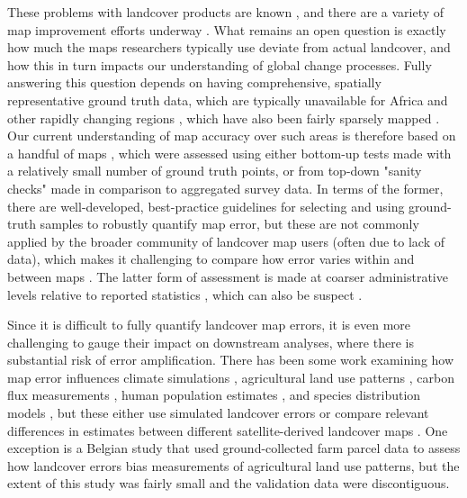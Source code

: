 \documentclass[a4paper]{article}
\begin{document}
These problems with landcover products are known \citep{fritz_comparison_2010, fritz_cropland_2011, see_improved_2015, fritz_mapping_2015,verburg_challenges_2011}, and there are a variety of map improvement efforts underway \citep[e.g.][]{fritz_geo-wiki:_2012, estes_platform_2015}. What remains an open question is exactly how much the maps researchers typically use deviate from actual landcover, and how this in turn impacts our understanding of global change processes. Fully answering this question depends on having comprehensive, spatially representative ground truth data, which are typically unavailable for Africa and other rapidly changing regions \citep{see_improved_2015}, which have also been fairly sparsely mapped \citep{yu_meta-discoveries_2014}. Our current understanding of map accuracy over such areas is therefore based on a handful of maps \citep{yu_meta-discoveries_2014}, which were assessed using either bottom-up tests made with a relatively small number of ground truth points, or from top-down "sanity checks" made in comparison to aggregated survey data.  In terms of the former, there are well-developed, best-practice guidelines for selecting and using ground-truth samples to robustly quantify map error, but these are not commonly applied by the broader community of landcover map users (often due to lack of data), which makes it challenging to compare how error varies within and between maps \citep{stehman_global_2012, olofsson_making_2013,olofsson_good_2014,foody_status_2002}. The latter form of assessment is made at coarser administrative levels relative to reported statistics \citep[e.g.][]{fritz_comparison_2010}, which can also be suspect \citep{carletto_emperor_2013,fao_action_2013}. 

Since it is difficult to fully quantify landcover map errors, it is even more challenging to gauge their impact on downstream analyses, where there is substantial risk of error amplification\citep{kuemmerle_challenges_2013}. There has been some work examining how map error influences climate simulations \citep{ge_impacts_2007}, agricultural land use patterns \citep{schmit_limitations_2006}, carbon flux measurements \citep{quaife_impact_2008}, human population estimates \citep{linard_assessing_2010}, and species distribution models \citep{tuanmu_global_2014}, but these either use simulated landcover errors \citep{ge_impacts_2007} or compare relevant differences in estimates between different satellite-derived landcover maps \citep{linard_assessing_2010, quaife_impact_2008,tuanmu_global_2014}. One exception is a Belgian study \citep{schmit_limitations_2006} that used ground-collected farm parcel data to assess how landcover errors bias measurements of agricultural land use patterns, but the extent of this study was fairly small and the validation data were discontiguous. 
\end{document}

